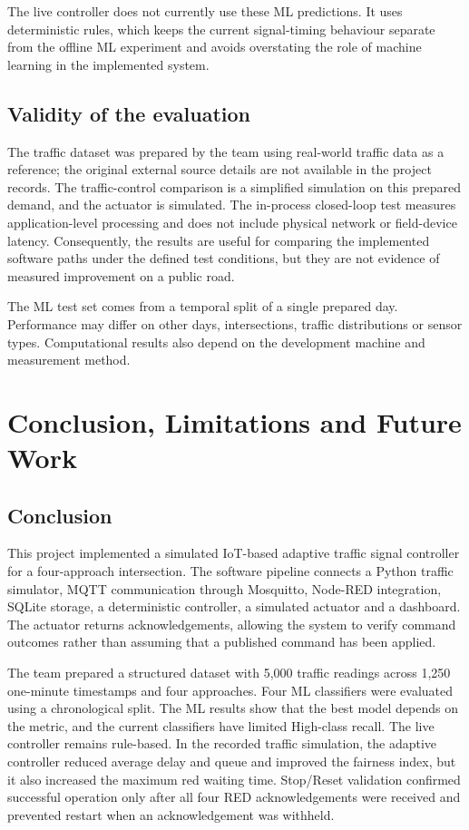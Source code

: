 \documentclass[12pt,a4paper,oneside]{report}
\begin{document}
The live controller does not currently use these ML predictions. It uses deterministic rules, which keeps the current signal-timing behaviour separate from the offline ML experiment and avoids overstating the role of machine learning in the implemented system.

\section{Validity of the evaluation}
The traffic dataset was prepared by the team using real-world traffic data as a reference; the original external source details are not available in the project records. The traffic-control comparison is a simplified simulation on this prepared demand, and the actuator is simulated. The in-process closed-loop test measures application-level processing and does not include physical network or field-device latency. Consequently, the results are useful for comparing the implemented software paths under the defined test conditions, but they are not evidence of measured improvement on a public road.

The ML test set comes from a temporal split of a single prepared day. Performance may differ on other days, intersections, traffic distributions or sensor types. Computational results also depend on the development machine and measurement method.

\clearpage
\chapter{Conclusion, Limitations and Future Work}
\section{Conclusion}
This project implemented a simulated IoT-based adaptive traffic signal controller for a four-approach intersection. The software pipeline connects a Python traffic simulator, MQTT communication through Mosquitto, Node-RED integration, SQLite storage, a deterministic controller, a simulated actuator and a dashboard. The actuator returns acknowledgements, allowing the system to verify command outcomes rather than assuming that a published command has been applied.

The team prepared a structured dataset with 5,000 traffic readings across 1,250 one-minute timestamps and four approaches. Four ML classifiers were evaluated using a chronological split. The ML results show that the best model depends on the metric, and the current classifiers have limited High-class recall. The live controller remains rule-based. In the recorded traffic simulation, the adaptive controller reduced average delay and queue and improved the fairness index, but it also increased the maximum red waiting time. Stop/Reset validation confirmed successful operation only after all four RED acknowledgements were received and prevented restart when an acknowledgement was withheld.
\end{document}
